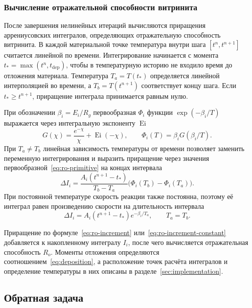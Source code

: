 \subsubsection{Вычисление отражательной способности витринита}

После завершения нелинейных итераций вычисляются приращения аррениусовских интегралов, определяющих отражательную способность витринита. В каждой материальной точке температура внутри шага $[t^n,t^{n+1}]$ считается линейной по времени. Интегрирование начинается с момента $t_* = \max(t^n,t_{\mathrm{dep}})$, чтобы в температурную историю не входило время до отложения материала. Температура $T_a=T(t_*)$ определяется линейной интерполяцией во времени, а $T_b=T(t^{n+1})$ соответствует концу шага. Если $t_*\geq t^{n+1}$, приращение интеграла принимается равным нулю.

При обозначении $\beta_i=E_i/R_g$ первообразная $\Phi_i$ функции $\exp(-\beta_i/T)$ выражается через интегральную экспоненту $\operatorname{Ei}$
\begin{equation}
 G(\chi) = \frac{e^{-\chi}}{\chi} + \operatorname{Ei}(-\chi),\qquad
 \Phi_i(T) = \beta_i G(\beta_i/T).
 \label{eq:ro-primitive}
\end{equation}
При $T_a\ne T_b$ линейная зависимость температуры от времени позволяет заменить переменную интегрирования и выразить приращение через значения первообразной~\eqref{eq:ro-primitive} на концах интервала
\begin{equation}
 \Delta I_i = \frac{A_i(t^{n+1} - t_*)}{T_b - T_a}
             \bigl(\Phi_i(T_b) - \Phi_i(T_a)\bigr).
 \label{eq:ro-increment}
\end{equation}
При постоянной температуре скорость реакции также постоянна, поэтому её интеграл равен произведению скорости на длительность интервала
\begin{equation}
 \Delta I_i = A_i(t^{n+1} - t_*)e^{-\beta_i/T_a},\qquad T_a=T_b.
 \label{eq:ro-increment-constant}
\end{equation}

Приращение по формуле~\eqref{eq:ro-increment} или~\eqref{eq:ro-increment-constant} добавляется к накопленному интегралу $I_i$, после чего вычисляется отражательная способность $R_o$. Моменты отложения определяются соотношением~\eqref{eq:deposition}, а расположение точек расчёта интегралов и определение температуры в них описаны в разделе~\ref{sec:implementation}.

\subsection{Обратная задача}
\label{sec:inverse-method}

